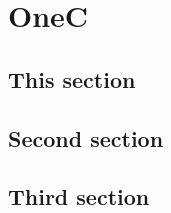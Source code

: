 \documentclass[oneside]{memoir}
\begin{document}
\dominitoc \tableofcontents*

\chapter[OneA][OneB]{OneC}
\minitoc
\section{This section} \lipsum[1]
\section{Second section} \lipsum[2]
\section{Third section} \lipsum[3]
\end{document}
